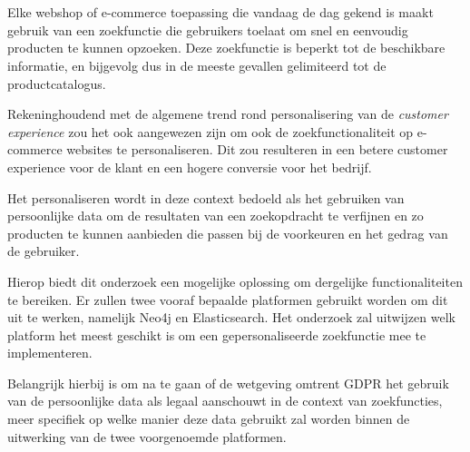 
\chapter{}
\label{ch:inleiding}

\section{}
\label{sec:probleemstelling}

Elke webshop of e-commerce toepassing die vandaag de dag gekend is maakt gebruik van een zoekfunctie die gebruikers toelaat om snel en eenvoudig producten te kunnen opzoeken. Deze zoekfunctie is beperkt tot de beschikbare informatie, en bijgevolg dus in de meeste gevallen gelimiteerd tot de productcatalogus.

 Rekeninghoudend met de algemene trend rond personalisering van de \textit{customer experience } zou het ook aangewezen zijn om ook de zoekfunctionaliteit op e-commerce websites te personaliseren. Dit zou resulteren in een betere customer experience voor de klant en een hogere conversie voor het bedrijf.
 
 Het personaliseren wordt in deze context bedoeld als het gebruiken van persoonlijke data om de resultaten van een zoekopdracht te verfijnen en zo producten te kunnen aanbieden die passen bij de voorkeuren en het gedrag van de gebruiker. 
 
 Hierop biedt dit onderzoek een mogelijke oplossing om dergelijke functionaliteiten te bereiken. Er zullen twee vooraf bepaalde platformen gebruikt worden om dit uit te werken, namelijk Neo4j en Elasticsearch. Het onderzoek zal uitwijzen welk platform het meest geschikt is om een gepersonaliseerde zoekfunctie mee te implementeren.
 
  Belangrijk hierbij is om na te gaan of de wetgeving omtrent GDPR het gebruik van de persoonlijke data als legaal aanschouwt in de context van zoekfuncties, meer specifiek op welke manier deze data gebruikt zal worden binnen de uitwerking van de twee voorgenoemde platformen.


\section{}
\label{sec:onderzoeksvraag}

